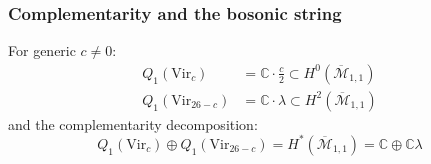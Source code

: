 \subsubsection{Complementarity and the bosonic string}

\begin{theorem}
\label{thm:vir-genus1-complementarity}
For generic $c \neq 0$:
\begin{align}
Q_1(\mathrm{Vir}_c) &= \mathbb{C} \cdot \tfrac{c}{2}
  \subset H^0(\overline{\mathcal{M}}_{1,1}) \label{eq:Q1-vir} \\
Q_1(\mathrm{Vir}_{26-c}) &= \mathbb{C} \cdot \lambda
  \subset H^2(\overline{\mathcal{M}}_{1,1}) \label{eq:Q1-vir-dual}
\end{align}
and the complementarity decomposition:
\begin{equation}\label{eq:vir-complementarity}
Q_1(\mathrm{Vir}_c) \oplus Q_1(\mathrm{Vir}_{26-c})
  = H^*(\overline{\mathcal{M}}_{1,1}) = \mathbb{C} \oplus \mathbb{C}\lambda
\end{equation}
\end{theorem}

